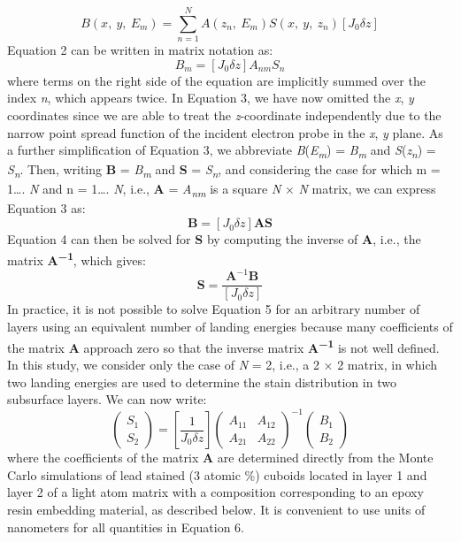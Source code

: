 \documentclass{article}
\begin{document}
\begin{equation}
B(x,\ y,\ E_m) = \sum_{n=1}^{N} A(z_n,\ E_m)S(x,\ y,\ z_n)[J_0\delta z] \tag{2}
\end{equation}
Equation 2 can be written in matrix notation as:
\begin{equation}
B_m = [J_0\delta z]A_{nm}S_n \tag{3}
\end{equation}
where terms on the right side of the equation are implicitly summed over the index \emph{n}, which appears twice. In Equation 3, we have now omitted the \emph{x}, \emph{y} coordinates since we are able to treat the \emph{z}-coordinate independently due to the narrow point spread function of the incident electron probe in the \emph{x}, \emph{y} plane. As a further simplification of Equation 3, we abbreviate \emph{B}(\emph{E}\textsubscript{\emph{m}}) = \emph{B}\textsubscript{\emph{m}} and \emph{S}(\emph{z}\textsubscript{\emph{n}}) = \emph{S}\textsubscript{\emph{n}}. Then, writing \textbf{B} = \emph{B}\textsubscript{\emph{m}} and \textbf{S} = \emph{S}\textsubscript{\emph{n}}, and considering the case for which m = 1…. \emph{N} and n = 1…. \emph{N}, i.e., \textbf{A} = \emph{A}\textsubscript{\emph{nm}} is a square \emph{N} × \emph{N} matrix, we can express Equation 3 as:
\begin{equation}
\mathbf{B} = [J_0\delta z]\mathbf{AS} \tag{4}
\end{equation}
Equation 4 can then be solved for \textbf{S} by computing the inverse of \textbf{A}, i.e., the matrix \textbf{A}\textsuperscript{\textbf{−1}}, which gives:
\begin{equation}
\mathbf{S} = \frac{\boldsymbol{A}^{-1}\boldsymbol{B}}{[J_0\delta z]} \tag{5}
\end{equation}
In practice, it is not possible to solve Equation 5 for an arbitrary number of layers using an equivalent number of landing energies because many coefficients of the matrix \textbf{A} approach zero so that the inverse matrix \textbf{A}\textsuperscript{\textbf{−1}} is not well defined. In this study, we consider only the case of \emph{N} = 2, i.e., a 2 × 2 matrix, in which two landing energies are used to determine the stain distribution in two subsurface layers. We can now write:
\begin{equation}
\begin{pmatrix} S_1\\ S_2 \end{pmatrix} = \left[\frac{1}{J_0\delta z}\right]\begin{pmatrix} A_{11} & A_{12}\\ A_{21} & A_{22} \end{pmatrix}^{-1}\begin{pmatrix} B_1\\ B_2 \end{pmatrix} \tag{6}
\end{equation}
where the coefficients of the matrix \textbf{A} are determined directly from the Monte Carlo simulations of lead stained (3 atomic \%) cuboids located in layer 1 and layer 2 of a light atom matrix with a composition corresponding to an epoxy resin embedding material, as described below. It is convenient to use units of nanometers for all quantities in Equation 6.
\end{document}
